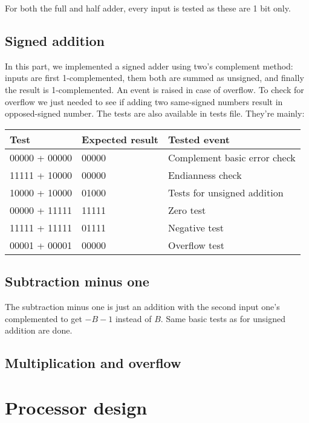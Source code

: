 \documentclass[a4paper]{report}
\begin{document}
	For both the full and half adder, every input is tested as these are 1 bit only. \\

\subsection{Signed addition}

	In this part, we implemented a signed adder using two's complement method: inputs are first 1-complemented, them both are summed as unsigned, and finally the result is 1-complemented. An event is raised in case of overflow. To check for overflow we just needed to see if adding two same-signed numbers result in opposed-signed number. The tests are also available in tests file. They're mainly:

\begin{center}
	\begin{tabular}{|l|l|l|}
		\hline
		Test & Expected result & Tested event \\
		\hline \hline
		00000 + 00000 & 00000 & Complement basic error check \\
		11111 + 10000 & 00000 & Endianness check \\
		10000 + 10000 & 01000 & Tests for unsigned addition \\
		00000 + 11111 & 11111 & Zero test \\
		11111 + 11111 & 01111 & Negative test \\
		00001 + 00001 & 00000 & Overflow test \\
		\hline
	\end{tabular}
\end{center}

\subsection{Subtraction minus one}

	The subtraction minus one is just an addition with the second input one's complemented to get $-B-1$ instead of $B$. Same basic tests as for unsigned addition are done.

\subsection{Multiplication and overflow}

\section{Processor design}
\end{document}
